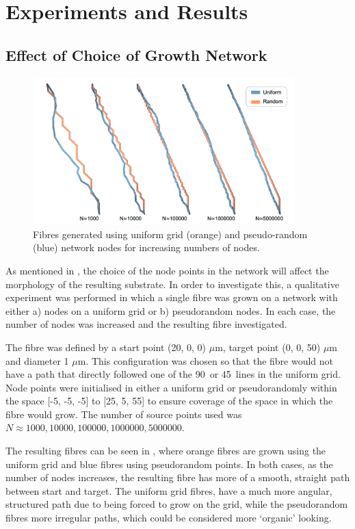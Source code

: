 \section{Experiments and Results}
\label{sec:impi_experiments_and_results}
\subsection{Effect of Choice of Growth Network}
\label{sec:ipmi_choice_of_network}
\begin{figure}
  \centering
  \includegraphics[width=0.9\textwidth]{figures/ipmi_implementation/uniform_vs_rand.png}
  \caption{Fibres generated using uniform grid (orange) and pseudo-random (blue) network nodes for increasing numbers of nodes.}
  \label{fig:ipmi_uniform_vs_rand}
\end{figure}
As mentioned in , the choice of the node points in the network will affect the morphology of the resulting substrate.
In order to investigate this, a qualitative experiment was performed in which a single fibre was grown on a network with either a) nodes on a uniform grid or b) pseudorandom nodes.
In each case, the number of nodes was increased and the resulting fibre investigated.

The fibre was defined by a start point (20, 0, 0) $\mu$m,  target point (0, 0, 50) $\mu$m and diameter 1 $\mu$m.
This configuration was chosen so that the fibre would not have a path that directly followed one of the 90\degree\ or 45\degree\ lines in the uniform grid.
Node points were initialised in either a uniform grid or pseudorandomly within the space [-5, -5, -5] to [25, 5, 55] to ensure coverage of the space in which the fibre would grow.
The number of source points used was $N \approx 1000, 10000, 100000, 1000000, 5000000$.

The resulting fibres can be seen in , where orange fibres are grown using the uniform grid and blue fibres using pseudorandom points.
In both cases, as the number of nodes increases, the resulting fibre has more of a smooth, straight path between start and target.
The uniform grid fibres, have a much more angular, structured path due to being forced to grow on the grid, while the pseudorandom fibres more irregular paths, which could be considered more `organic' looking.


